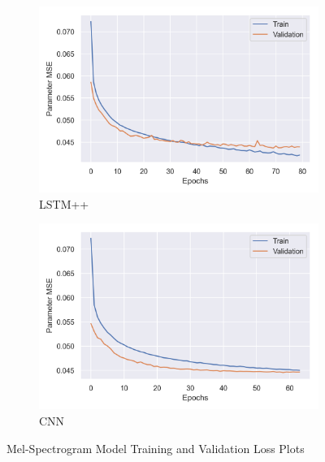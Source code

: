 \begin{figure}[t]
    \begin{subfigure}[b]{0.49\textwidth}
        \centering
        \includegraphics[width=\textwidth]{figures/inverse-synth/loss-plots/bilstm-mel.png}
        \caption{LSTM++}
    \end{subfigure}
    \begin{subfigure}[b]{0.49\textwidth}
        \centering
        \includegraphics[width=\textwidth]{figures/inverse-synth/loss-plots/cnn-mel.png}
        \caption{CNN}
    \end{subfigure}
    \caption{Mel-Spectrogram Model Training and Validation Loss Plots}
\end{figure}